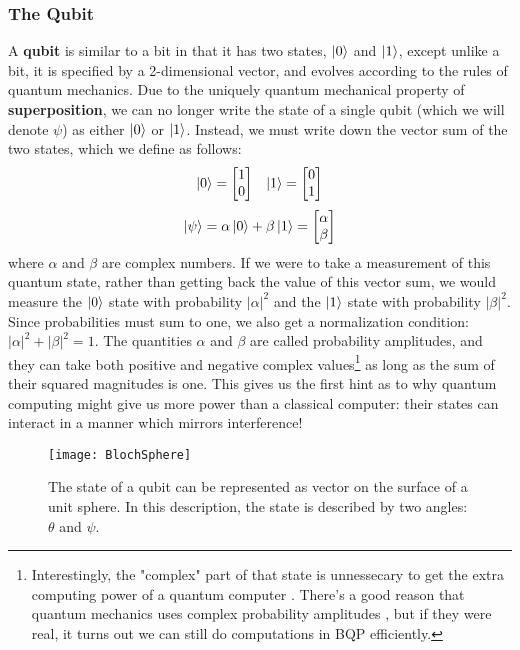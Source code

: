 \subsubsection{The Qubit}
A \textbf{qubit} is similar to a bit in that it has two states, $\ket{0}$ and $\ket{1}$, except unlike a bit, it is specified
by a 2-dimensional vector, and evolves according to the rules of quantum mechanics. Due to the uniquely quantum
mechanical property of \textbf{superposition}, we can no longer write the state of a single qubit (which we will
denote $\psi$) as either $\ket{0}$ or $\ket{1}$. Instead, we must write down the vector sum of the two states,
which we define as follows:
\begin{align}
  \label{eqn:basisstates}
  \ket{0} = \begin{bmatrix}1\\0\end{bmatrix} && \ket{1} = \begin{bmatrix}0\\1\end{bmatrix}
\end{align}
\begin{equation}
  \ket{\psi} = \alpha \ket{0} + \beta \ket{1} = \begin{bmatrix}\alpha\\\beta\end{bmatrix}
\end{equation}
where $\alpha$ and $\beta$ are complex numbers. If we were to take a measurement of this quantum state,
rather than getting back the value of this vector sum, we would measure the $\ket{0}$ state with probability
$|\alpha|^2$ and the $\ket{1}$ state with probability $|\beta|^2$. Since probabilities must sum to one, we also
get a normalization condition: $|\alpha|^2 + |\beta|^2 = 1$. The quantities $\alpha$ and $\beta$ are called
probability amplitudes, and they can take both positive and negative complex values\footnote{Interestingly, the "complex"
  part of that state is unnessecary to get the extra computing power
  of a quantum computer \cite{doi:10.1142/S0219749913500019}. There's a good reason that quantum mechanics
  uses complex probability amplitudes \cite{2004quant.ph..1062A}, but if they were real, it turns out
  we can still do computations in \textsc{BQP} efficiently.}
as long as the sum of their squared magnitudes is one. This gives us the first hint as to why quantum computing
might give us more power than a classical computer: their states can interact in a manner which mirrors
interference!

\begin{figure}
  \texttt{[image: BlochSphere]}
  \caption[The Bloch Sphere representation of a qubit]
  {The state of a qubit can be represented as vector on the surface of a unit sphere. In this description,
  the state is described by two angles: $\theta$ and $\psi$.}
  \label{fig:bloch}
\end{figure}

